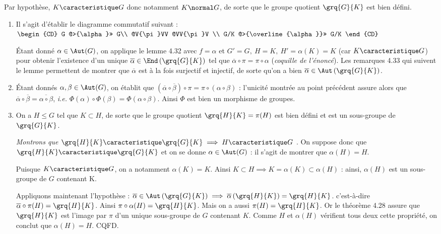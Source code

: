 Par hypothèse, $K \caracteristique G$ donc notamment $K\normal G$, de sorte que le groupe quotient $\grq{G}{K}$ est bien défini.

\begin{enumerate}
    \item Il s'agit d'établir le diagramme commutatif suivant :
    $\begin{CD}
    G @>{\alpha}>> G\\
    @V{\pi}VV @VV{\pi}V \\
    G/K @>{\overline{\alpha}}>> G/K
    \end{CD}$
    
    
    Étant donné $\alpha\in \Aut(G)$, on applique le lemme 4.32 avec $f =\alpha$ et  $G'=G,~ H = K,~ H' = \alpha(K) = K$ (car $K \caracteristique G$) pour obtenir 
     l'existence d'un unique $\overline{\alpha} \in \End \left(\grq{G}{K} \right)$ tel que $\overline{\alpha}\circ \pi = \pi \circ \alpha$ (\textit{coquille de l'énoncé}).
     Les remarques 4.33 qui suivent le lemme permettent de montrer que $ \overline{\alpha}$ est à la fois surjectif et injectif, de sorte qu'on a bien $\overline{\alpha} \in \Aut \left(\grq{G}{K} \right)$.

    \item Étant donnés $\alpha, \beta \in \Aut(G)$, on établit que $\left(\overline{\alpha}\circ \overline{\beta}\right) \circ \pi = \pi \circ \left(\alpha\circ \beta \right)$ : 
    l'unicité montrée au point précédent assure alors que $ \overline{\alpha}\circ \overline{\beta} = \overline{\alpha \circ \beta}$, \textit{i.e.} $\Phi(\alpha) \circ \Phi(\beta) = \Phi(\alpha\circ \beta)$. 
    Ainsi $\Phi$ est bien un morphisme de groupes.

    \item On a $H\leq G$ tel que $K\subset H$, de sorte que le groupe quotient $\grq{H}{K} = \pi(H)$ est bien défini et est un sous-groupe de $\grq{G}{K}$.
    
    \emph{Montrons que $\grq{H}{K} \caracteristique \grq{G}{K}  \implies H  \caracteristique G$ }. On suppose donc que $\grq{H}{K} \caracteristique \grq{G}{K} $ et on se donne $\alpha \in \Aut(G)$ :
     il s'agit de montrer que $\alpha(H) = H$. 

    Puisque $K  \caracteristique G$, on a notamment  $\alpha(K) = K$. Ainsi  $K\subset H \implies K = \alpha(K) \subset \alpha(H)$ : ainsi, $\alpha(H)$ est un sous-groupe de $G$ contenant K.

    
   Appliquons maintenant l'hypothèse : $\overline{\alpha} \in \Aut \left(\grq{G}{K} \right) \implies \overline{\alpha}\left(\grq{H}{K}  \right) = \grq{H}{K}$. c'est-à-dire $\overline{\alpha} \circ \pi(H) = \grq{H}{K}$.
    Ainsi $\pi \circ \alpha(H) = \grq{H}{K}$. Mais on a aussi $\pi(H) = \grq{H}{K}$. Or le théorème 4.28 assure que $\grq{H}{K}$ est l'image par $\pi$ d'un unique sous-groupe de $G$ contenant $K$. 
    Comme $H$ et $\alpha(H)$ vérifient tous deux cette propriété, on conclut que $\alpha(H) = H$. CQFD.


\end{enumerate}
